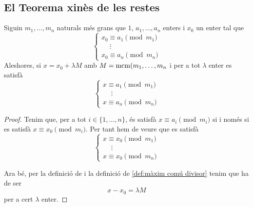\documentclass[../Apunts.tex]{subfiles}
\begin{document}
	\subsection{El Teorema xinès de les restes}
	\begin{lemma}
		\label{lema:thm:Teorema xinès de les restes}
		Siguin \(m_{1},\dots,m_{n}\) naturals més grans que \(1\), \(a_{1},\dots,a_{n}\) enters i \(x_{0}\) un enter tal que
		\[\begin{cases}
			x_{0}\equiv a_{1}\pmod{m_{1}}\\
			\quad\ \vdots\\
			x_{0}\equiv a_{n}\pmod{m_{n}}
		\end{cases}\]
		Aleshores, si \(x=x_{0}+\lambda M\) amb \(M=\operatorname{mcm}(m_{1},\dots,m_{n}\) i per a tot \(\lambda\) enter es satisfà
		\[\begin{cases}
		x\equiv a_{1}\pmod{m_{1}}\\
		\quad\ \vdots\\
		x\equiv a_{n}\pmod{m_{n}}
		\end{cases}\]
		\begin{proof}
			Tenim que, per a tot \(i\in\{1,\dots,n\}\), és satisfà \(x\equiv a_{i}\pmod{m_{i}}\) si i només si es satisfà \(x\equiv x_{0}\pmod{m_{i}}\). Per tant hem de veure que es satisfà
			\[\begin{cases}
			x\equiv x_{0}\pmod{m_{1}}\\
			\quad\ \vdots\\
			x\equiv x_{0}\pmod{m_{n}}
			\end{cases}\]
			
			Ara bé, per la definició de  i la definició de \ref{def:màxim comú divisor} tenim que ha de ser
			\[x-x_{0}=\lambda M\]
			per a cert \(\lambda\) enter.
		\end{proof}
	\end{lemma}
\end{document}
